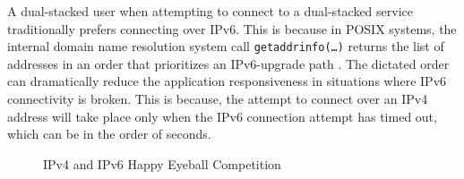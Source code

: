 A dual-stacked user when attempting to connect to a dual-stacked service
traditionally prefers connecting over IPv6. This is because in POSIX systems,
the internal domain name resolution system call \texttt{getaddrinfo(\ldots)}
\cite{rfc3493} returns the list of addresses in an order that prioritizes an
IPv6-upgrade path \cite{rfc6724}. The dictated order can dramatically reduce
the application responsiveness in situations where IPv6 connectivity is
broken. This is because, the attempt to connect over an IPv4 address will take
place only when the IPv6 connection attempt has timed out, which can be in the
order of seconds.

\begin{figure}
  \begin{minipage}[h]{0.50\textwidth}
    \centering
  \end{minipage}
  \begin{minipage}[h]{0.50\textwidth}
    \centering
  \end{minipage}
\caption{\label{fig:happy-v4-v6-compete}IPv4 and IPv6 Happy Eyeball Competition}
\end{figure}

